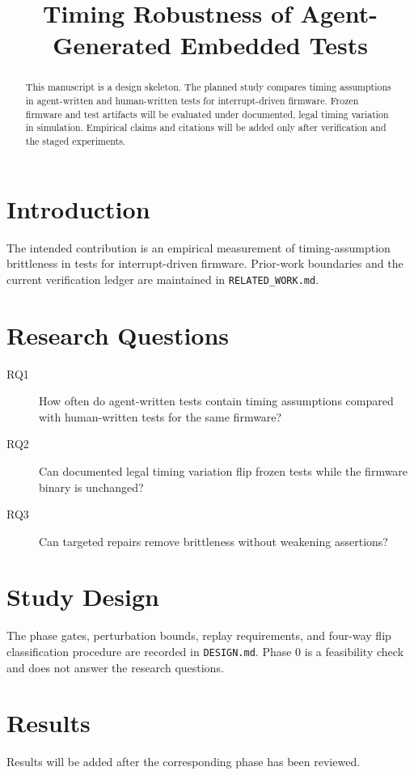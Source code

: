 \documentclass[sigconf,review,anonymous]{acmart}
\begin{document}
\title{Timing Robustness of Agent-Generated Embedded Tests}

\begin{abstract}
This manuscript is a design skeleton. The planned study compares timing assumptions in agent-written and human-written tests for interrupt-driven firmware. Frozen firmware and test artifacts will be evaluated under documented, legal timing variation in simulation. Empirical claims and citations will be added only after verification and the staged experiments.
\end{abstract}

\maketitle

\section{Introduction}
The intended contribution is an empirical measurement of timing-assumption brittleness in tests for interrupt-driven firmware. Prior-work boundaries and the current verification ledger are maintained in \texttt{RELATED\_WORK.md}.

\section{Research Questions}
\begin{description}
  \item[RQ1] How often do agent-written tests contain timing assumptions compared with human-written tests for the same firmware?
  \item[RQ2] Can documented legal timing variation flip frozen tests while the firmware binary is unchanged?
  \item[RQ3] Can targeted repairs remove brittleness without weakening assertions?
\end{description}

\section{Study Design}
The phase gates, perturbation bounds, replay requirements, and four-way flip classification procedure are recorded in \texttt{DESIGN.md}. Phase 0 is a feasibility check and does not answer the research questions.

\section{Results}
Results will be added after the corresponding phase has been reviewed.
\end{document}
